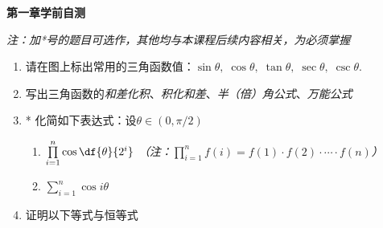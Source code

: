 \begin{center}
	{\Large\bf 第一章\;学前自测}
	
	{\it 注：加*号的题目可选作，其他均与本课程后续内容相关，为必须掌握}
\end{center}

\begin{enumerate}
  \item 请在图上标出常用的三角函数值：$\sin\theta,\;\cos\theta,\;\tan\theta,\;
  \sec\theta,\;\csc\theta.$
  \begin{figure}[!htb]
  	\centering
  \end{figure}
  \item 写出三角函数的{\it 和差化积}、{\it 积化和差}、{\it 半（倍）角公式}、{\it 万能公式}
  \item* 化简如下表达式：设$\theta\in\left(0,\pi/2\right)$
  \begin{enumerate}[(1)]
    \item $\prod\limits_{i=1}^n\cos\df{\theta}{2^i}$
    \hspace{2cm}
    {\it（注：$\prod\limits_{i=1}^nf(i)=f(1)\cdot f(2)\cdot\cdots\cdot
    f(n)$）}
    \item $\sum\limits_{i=1}^n\cos i\theta$
  \end{enumerate}
  \item 证明以下等式与恒等式

\end{enumerate}
